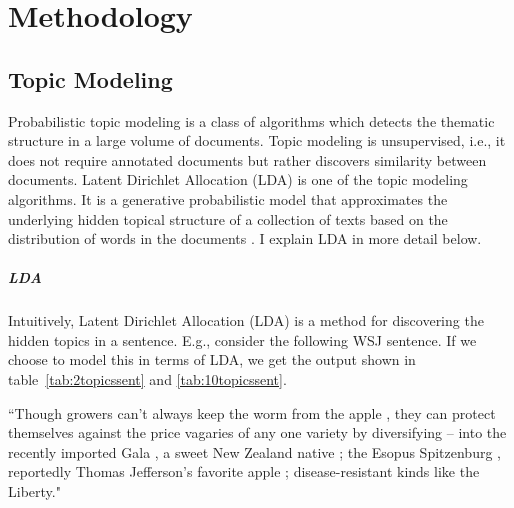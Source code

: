 \chapter{Methodology}









\section{Topic Modeling}

Probabilistic topic modeling is a class of algorithms which detects
the thematic structure in a large volume of documents. Topic modeling
is unsupervised, i.e., it does not require annotated
documents \cite{Blei:2012:PTM:2133806.2133826} but rather discovers similarity between documents. Latent Dirichlet
Allocation (LDA) is one of the topic modeling algorithms. It is a
generative probabilistic model that approximates the underlying hidden topical structure of a collection of texts based on the distribution of words in the documents \cite{Blei:2003:LDA:944919.944937}. I explain LDA in more detail below.

\paragraph*{LDA} 

Intuitively, Latent Dirichlet Allocation (LDA) is a method for discovering the hidden topics in a sentence. E.g., consider the following WSJ sentence. If we choose to model this in terms of LDA, we get the output shown in table~\ref{tab:2topicssent} and \ref{tab:10topicssent}.


``Though growers can't always keep the worm from the apple , they can protect themselves against the price vagaries of any one variety by diversifying -- into the recently imported Gala , a sweet New Zealand native ; the Esopus Spitzenburg , reportedly Thomas Jefferson's favorite apple ; disease-resistant kinds like the Liberty."
 

